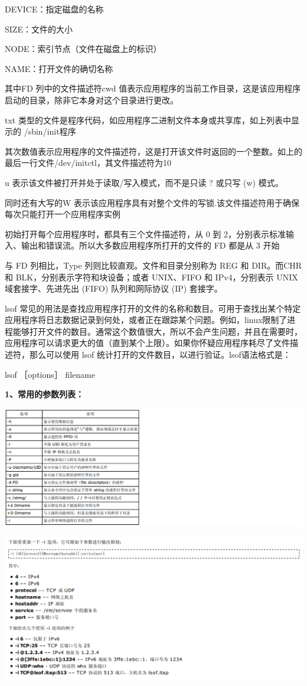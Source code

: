 \documentclass[letterpaper,10pt]{sphinxmanual}
\begin{document}
DEVICE：指定磁盘的名称

SIZE：文件的大小

NODE：索引节点（文件在磁盘上的标识）

NAME：打开文件的确切名称

其中FD 列中的文件描述符cwd 值表示应用程序的当前工作目录，这是该应用程序启动的目录，除非它本身对这个目录进行更改。

txt 类型的文件是程序代码，如应用程序二进制文件本身或共享库，如上列表中显示的 /sbin/init程序

其次数值表示应用程序的文件描述符，这是打开该文件时返回的一个整数。如上的最后一行文件/dev/initctl，其文件描述符为10

u 表示该文件被打开并处于读取/写入模式，而不是只读 ? 或只写 (w) 模式。

同时还有大写的W 表示该应用程序具有对整个文件的写锁.该文件描述符用于确保每次只能打开一个应用程序实例

初始打开每个应用程序时，都具有三个文件描述符，从 0 到 2，分别表示标准输入、输出和错误流。所以大多数应用程序所打开的文件的 FD 都是从 3 开始

与 FD 列相比，Type 列则比较直观。文件和目录分别称为 REG 和 DIR。而CHR 和 BLK，分别表示字符和块设备；或者 UNIX、FIFO 和 IPv4，分别表示 UNIX 域套接字、先进先出 (FIFO) 队列和网际协议 (IP) 套接字。

lsof 常见的用法是查找应用程序打开的文件的名称和数目。可用于查找出某个特定应用程序将日志数据记录到何处，或者正在跟踪某个问题。例如，linux限制了进程能够打开文件的数目。通常这个数值很大，所以不会产生问题，并且在需要时，应用程序可以请求更大的值（直到某个上限）。如果你怀疑应用程序耗尽了文件描述符，那么可以使用 lsof 统计打开的文件数目，以进行验证。lsof语法格式是：

lsof ［options］ filename

\textbf{1、常用的参数列表：}

\includegraphics{lsof0.png}

\includegraphics{lsof00.png}
\end{document}
